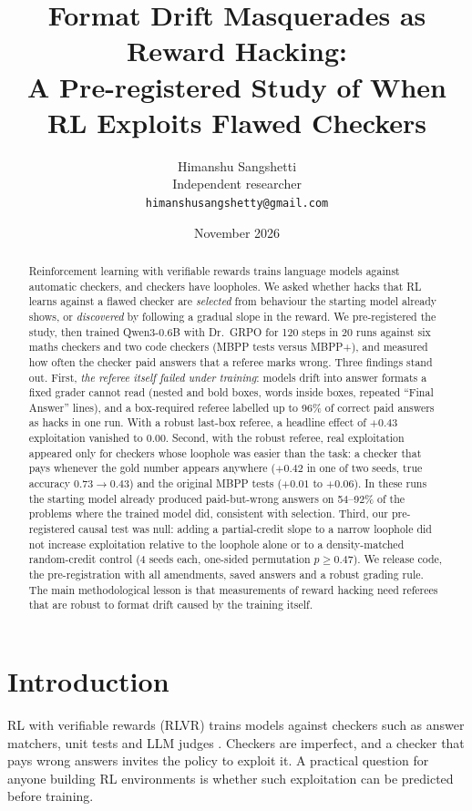 \documentclass[11pt]{article}
\title{Format Drift Masquerades as Reward Hacking:\\
A Pre-registered Study of When RL Exploits Flawed Checkers}
\author{Himanshu Sangshetti\\ Independent researcher\\ \texttt{himanshusangshetty@gmail.com}}
\date{November 2026}
\begin{document}
\maketitle

\begin{abstract}
Reinforcement learning with verifiable rewards trains language models against automatic checkers, and checkers have loopholes. We asked whether hacks that RL learns against a flawed checker are \emph{selected} from behaviour the starting model already shows, or \emph{discovered} by following a gradual slope in the reward. We pre-registered the study, then trained Qwen3-0.6B with Dr.~GRPO for 120 steps in 20 runs against six maths checkers and two code checkers (MBPP tests versus MBPP+), and measured how often the checker paid answers that a referee marks wrong. Three findings stand out. First, \emph{the referee itself failed under training}: models drift into answer formats a fixed grader cannot read (nested and bold boxes, words inside boxes, repeated ``Final Answer'' lines), and a box-required referee labelled up to 96\% of correct paid answers as hacks in one run. With a robust last-box referee, a headline effect of $+0.43$ exploitation vanished to $0.00$. Second, with the robust referee, real exploitation appeared only for checkers whose loophole was easier than the task: a checker that pays whenever the gold number appears anywhere ($+0.42$ in one of two seeds, true accuracy $0.73\to0.43$) and the original MBPP tests ($+0.01$ to $+0.06$). In these runs the starting model already produced paid-but-wrong answers on 54--92\% of the problems where the trained model did, consistent with selection. Third, our pre-registered causal test was null: adding a partial-credit slope to a narrow loophole did not increase exploitation relative to the loophole alone or to a density-matched random-credit control (4 seeds each, one-sided permutation $p \geq 0.47$). We release code, the pre-registration with all amendments, saved answers and a robust grading rule. The main methodological lesson is that measurements of reward hacking need referees that are robust to format drift caused by the training itself.
\end{abstract}

\section{Introduction}
RL with verifiable rewards (RLVR) trains models against checkers such as answer matchers, unit tests and LLM judges \citep{deepseekr1,drgrpo,dapo}. Checkers are imperfect, and a checker that pays wrong answers invites the policy to exploit it. A practical question for anyone building RL environments is whether such exploitation can be predicted before training.
\end{document}
